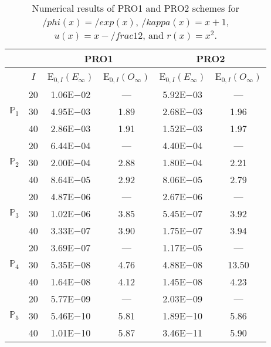 \begin{table}[H]
\caption{Numerical results of PRO1 and PRO2 schemes for $/phi(x)=/exp(x)$, $/kappa(x)=x+1$, $u(x)=x-/frac{1}{2}$, and $r(x)=x^2$.}
\setlength{\tabcolsep}{5pt}
\centering
\begin{tabular}{@{}l c c c c c@{}}
\toprule
 &  & \multicolumn{2}{c}{PRO1} & \multicolumn{2}{c}{PRO2}\\
\midrule
 & $I$ & E$_{0,I}(E_{\infty})$ & E$_{0,I}(O_{\infty})$ & E$_{0,I}(E_{\infty})$ & E$_{0,I}(O_{\infty})$\\
\midrule
\multirow{3}{*}{$\mathbb{P}_{1}$}
 & 20 & 1.06E$-$02 & --- & 5.92E$-$03 & ---\\
 & 30 & 4.95E$-$03 & 1.89 & 2.68E$-$03 & 1.96 \\
 & 40 & 2.86E$-$03 & 1.91 & 1.52E$-$03 & 1.97 \\
\midrule
\multirow{3}{*}{$\mathbb{P}_{2}$}
 & 20 & 6.44E$-$04 & --- & 4.40E$-$04 & ---\\
 & 30 & 2.00E$-$04 & 2.88 & 1.80E$-$04 & 2.21 \\
 & 40 & 8.64E$-$05 & 2.92 & 8.06E$-$05 & 2.79 \\
\midrule
\multirow{3}{*}{$\mathbb{P}_{3}$}
 & 20 & 4.87E$-$06 & --- & 2.67E$-$06 & ---\\
 & 30 & 1.02E$-$06 & 3.85 & 5.45E$-$07 & 3.92 \\
 & 40 & 3.33E$-$07 & 3.90 & 1.75E$-$07 & 3.94 \\
\midrule
\multirow{3}{*}{$\mathbb{P}_{4}$}
 & 20 & 3.69E$-$07 & --- & 1.17E$-$05 & ---\\
 & 30 & 5.35E$-$08 & 4.76 & 4.88E$-$08 & 13.50 \\
 & 40 & 1.64E$-$08 & 4.12 & 1.45E$-$08 & 4.23 \\
\midrule
\multirow{3}{*}{$\mathbb{P}_{5}$}
 & 20 & 5.77E$-$09 & --- & 2.03E$-$09 & ---\\
 & 30 & 5.46E$-$10 & 5.81 & 1.89E$-$10 & 5.86 \\
 & 40 & 1.01E$-$10 & 5.87 & 3.46E$-$11 & 5.90 \\
\bottomrule
\end{tabular}
\label{Table:PRO:Test9}
\end{table}
